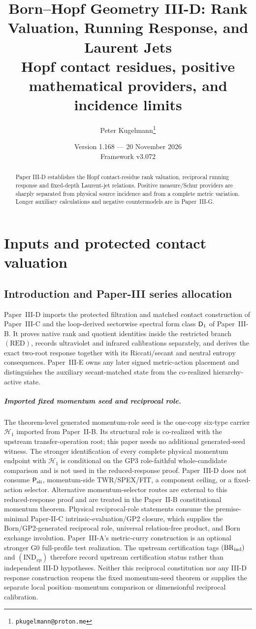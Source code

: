 \documentclass[12pt,a4paper]{article}
\title{\textbf{Born--Hopf Geometry III-D: Rank Valuation, Running Response, and Laurent Jets}\\[0.5em]
\large Hopf contact residues, positive mathematical providers, and incidence limits}
\author{Peter Kugelmann\thanks{\texttt{pkugelmann@proton.me}}}
\date{Version 1.168 --- 20 November 2026 \\ Framework v3.072}
\begin{document}
\maketitle
\begin{abstract}
Paper III-D establishes the Hopf contact-residue rank valuation,
reciprocal running response and fixed-depth Laurent-jet relations. Positive
measure/Schur providers are sharply separated from physical source incidence
and from a complete metric variation. Longer auxiliary calculations and
negative countermodels are in Paper~III-G.
\end{abstract}
\tableofcontents
\clearpage

\section{Inputs and protected contact valuation}
\label{paper3d:sec:organized-scope}
\subsection{Introduction and Paper-III series allocation}
\label{p3d:sec:series-allocation}
Paper~III-D imports the protected filtration and matched contact construction
of Paper~III-C and the loop-derived sectorwise spectral form class \(\mathsf{D}_1\) of
Paper~III-B.  It proves native rank and quotient identities inside the
restricted branch \((\mathrm{RED})\), records ultraviolet and infrared
calibrations separately, and derives the exact two-root response together with
its Riccati/secant and neutral entropy consequences.  Paper~III-E owns any
later signed metric-action placement and distinguishes the auxiliary
secant-matched state from the co-realized hierarchy-active state.

\subparagraph{Imported fixed momentum seed and reciprocal role.}
The theorem-level generated momentum-role seed is the one-copy
six-type carrier \(\mathcal H_1\) imported from Paper~II-B.
Its structural role is co-realized with the upstream transfer-operation
root; this paper needs no additional generated-seed witness.  The
stronger identification of every complete physical momentum endpoint
with \(\mathcal H_1\) is conditional on the GP3 role-faithful
whole-candidate comparison and is not used in the reduced-response proof.
Paper~III-D does not consume \(\mathsf P_{\rm sli}\), momentum-side
TWR/SPEX/FIT, a component ceiling, or a fixed-action selector.  Alternative
momentum-selector routes are external to this reduced-response proof and are treated in
the Paper~II-B constitutional momentum theorem.  Physical reciprocal-role statements
consume the premise-minimal Paper-II-C intrinsic-evaluation/GP2 closure, which
supplies the Born/GP2-generated reciprocal role, universal relation-free product, and
Born exchange involution.  Paper~III-A's metric-curry construction is an
optional stronger G0 full-profile test realization.  The upstream certification tags
\((\mathrm{BR}_{\rm ind})\) and \((\mathrm{IND}_{xp})\) therefore record
upstream certification status rather than independent III-D hypotheses.
Neither this reciprocal constitution nor any III-D response construction
reopens the fixed momentum-seed theorem or supplies the separate local
position--momentum comparison or dimensionful reciprocal calibration.
\end{document}
